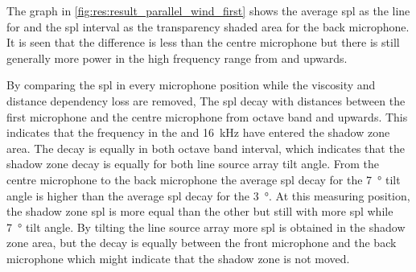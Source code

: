  
  
   
The graph in \autoref{fig:res:result_parallel_wind_first} shows the average \gls{spl} as the line for and the \gls{spl} interval as the transparency shaded area for the back microphone. It is seen that the difference is less than the centre microphone but there is still generally more power in the high frequency range from  and upwards.   


By comparing the \gls{spl} in every microphone position while the viscosity and distance dependency loss are removed, The \gls{spl} decay with distances between the first microphone and the centre microphone from  octave band and upwards. This indicates that the frequency in the  and \SI{16}{\kilo\hertz} have entered the shadow zone area. The decay is equally in both octave band interval, which indicates that the shadow zone decay is equally for both line source array tilt angle. From the centre microphone to the back microphone the average \gls{spl} decay for the \SI{7}{\degree} tilt angle is higher than the average \gls{spl} decay for the \SI{3}{\degree}. At this measuring position, the shadow zone \gls{spl} is more equal than the other but still with more \gls{spl} while \SI{7}{\degree} tilt angle. By tilting the line source array more \gls{spl} is obtained in the shadow zone area, but the decay is equally between the front microphone and the back microphone which might indicate that the shadow zone is not moved.
   

